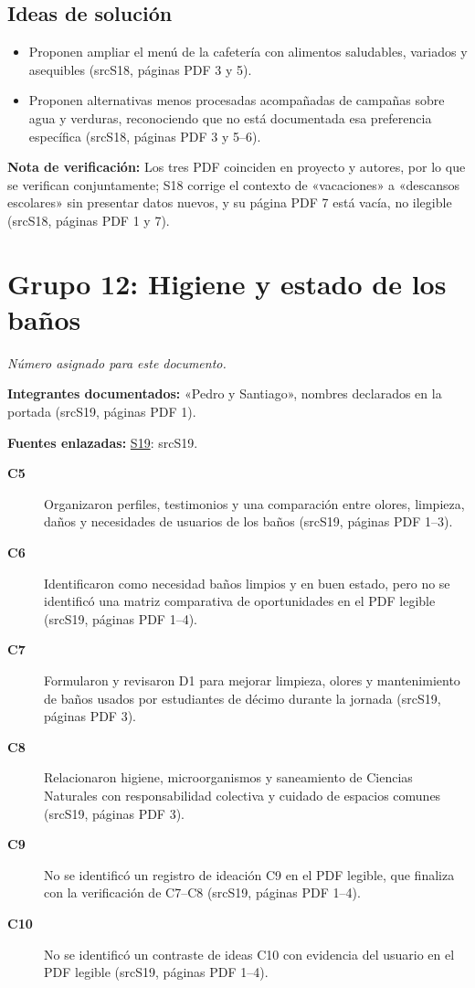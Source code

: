\documentclass[11pt,a4paper]{article}
\newcommand{\evid}[2]{(\csname src#1\endcsname, páginas PDF #2)}
\begin{document}
\subsection*{Ideas de solución}
\begin{itemize}
\item Proponen ampliar el menú de la cafetería con alimentos saludables, variados y asequibles \evid{S18}{3 y 5}.
\item Proponen alternativas menos procesadas acompañadas de campañas sobre agua y verduras, reconociendo que no está documentada esa preferencia específica \evid{S18}{3 y 5--6}.
\end{itemize}
{\small\textbf{Nota de verificación:} Los tres PDF coinciden en proyecto y autores, por lo que se verifican conjuntamente; S18 corrige el contexto de «vacaciones» a «descansos escolares» sin presentar datos nuevos, y su página PDF 7 está vacía, no ilegible \evid{S18}{1 y 7}.}
\clearpage
\section*{Grupo 12: Higiene y estado de los baños}
\textit{Número asignado para este documento.}

\textbf{Integrantes documentados:} «Pedro y Santiago», nombres declarados en la portada \evid{S19}{1}.

\textbf{Fuentes enlazadas:} \hyperlink{fuente-S19}{S19}: \csname srcS19\endcsname.

\begin{description}
\item[\textbf{C5}] Organizaron perfiles, testimonios y una comparación entre olores, limpieza, daños y necesidades de usuarios de los baños \evid{S19}{1--3}.
\item[\textbf{C6}] Identificaron como necesidad baños limpios y en buen estado, pero no se identificó una matriz comparativa de oportunidades en el PDF legible \evid{S19}{1--4}.
\item[\textbf{C7}] Formularon y revisaron D1 para mejorar limpieza, olores y mantenimiento de baños usados por estudiantes de décimo durante la jornada \evid{S19}{3}.
\item[\textbf{C8}] Relacionaron higiene, microorganismos y saneamiento de Ciencias Naturales con responsabilidad colectiva y cuidado de espacios comunes \evid{S19}{3}.
\item[\textbf{C9}] No se identificó un registro de ideación C9 en el PDF legible, que finaliza con la verificación de C7--C8 \evid{S19}{1--4}.
\item[\textbf{C10}] No se identificó un contraste de ideas C10 con evidencia del usuario en el PDF legible \evid{S19}{1--4}.
\end{description}
\end{document}
